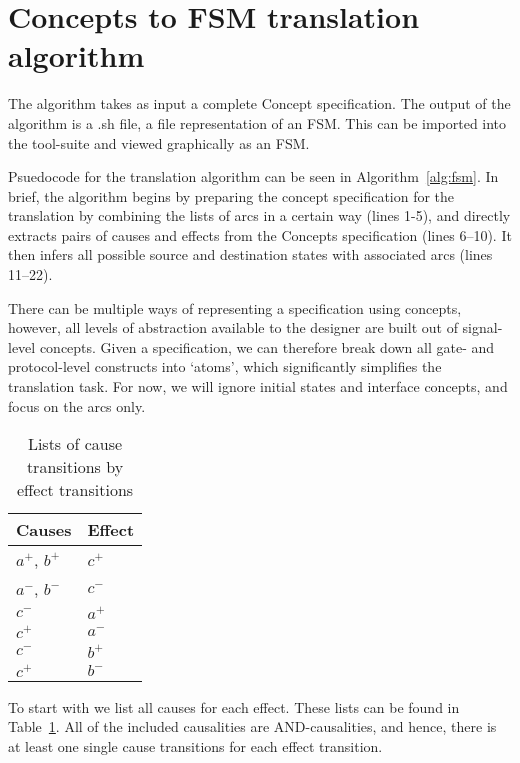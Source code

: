 \section{Concepts to FSM translation algorithm}\label{sec:algorithm}

The algorithm takes as input a complete Concept specification.
The output of the algorithm is a .sh file, a file representation of an FSM.
This can be imported into the  tool-suite and viewed graphically as an FSM\@.

Psuedocode for the translation algorithm can be seen in Algorithm~\ref{alg:fsm}.
In brief, the algorithm begins by preparing the concept specification for the translation by combining the lists of arcs in a certain way (lines 1-5), 
and directly extracts pairs of causes and effects from the Concepts specification (lines 6--10).
It then infers all possible source and destination states with associated arcs (lines 11--22).

There can be multiple ways of representing a specification using concepts, 
however, all levels of abstraction available to the designer are built out of signal-level
concepts. Given a specification, we can therefore break down 
all gate- and protocol-level constructs into `atoms', which significantly 
simplifies the translation task. For now, we will ignore initial states and interface
concepts, and focus on the arcs only.

\begin{table}[h]
\vspace{-2mm}
\caption{Lists of cause transitions by effect transitions
		\label{tab:list-of-concepts}}
  \centering
\begin{tabular}{@{}ll@{}}
	\toprule
	Causes & Effect\\ \midrule
	$a^{+}$, $b^{+}$	& $c^{+}$ \\
	$a^{-}$, $b^{-}$ 	& $c^{-}$ \\
	$c^{-}$			& $a^{+}$ \\
	$c^{+}$			& $a^{-}$ \\
	$c^{-}$			& $b^{+}$ \\
	$c^{+}$			& $b^{-}$ \\
	\bottomrule
\end{tabular}
\vspace{-5mm}
\end{table}

To start with we list all causes for each effect. 
These lists can be found in Table~\ref{tab:list-of-concepts}.
All of the included causalities are AND-causalities, and hence, there
is at least one single cause transitions for each effect transition. 

